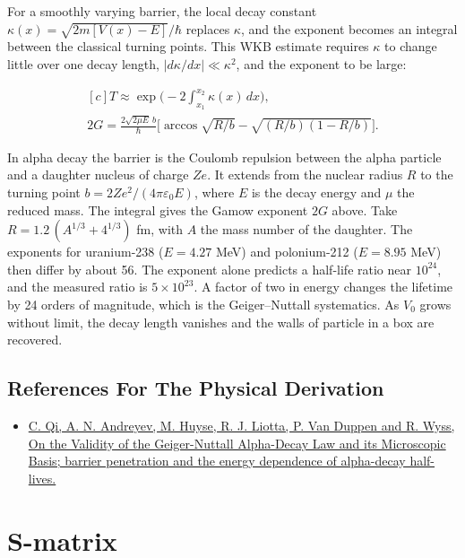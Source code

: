 \documentclass[11pt,oneside]{book}
\newenvironment{centeredalign}{\[\begin{gathered}[c]}{\end{gathered}\]}
\begin{document}
For a smoothly varying barrier, the local decay constant \(\kappa(x)=\sqrt{2m[V(x)-E]}/\hbar\) replaces \(\kappa\), and the exponent becomes an integral between the classical turning points. This WKB estimate requires \(\kappa\) to change little over one decay length, \(|d\kappa/dx|\ll\kappa^2\), and the exponent to be large:

\begin{centeredalign}
T\approx\exp\Big(-2\int_{x_1}^{x_2}\kappa(x)\,dx\Big),\\
2G=\frac{2\sqrt{2\mu E}\,b}{\hbar}\Big[\arccos\sqrt{R/b}-\sqrt{(R/b)(1-R/b)}\Big].
\end{centeredalign}

In alpha decay the barrier is the Coulomb repulsion between the alpha particle and a daughter nucleus of charge \(Ze\). It extends from the nuclear radius \(R\) to the turning point \(b=2Ze^2/(4\pi\varepsilon_0E)\), where \(E\) is the decay energy and \(\mu\) the reduced mass. The integral gives the Gamow exponent \(2G\) above. Take \(R=1.2\,(A^{1/3}+4^{1/3})\) fm, with \(A\) the mass number of the daughter. The exponents for uranium-238 (\(E=4.27\) MeV) and polonium-212 (\(E=8.95\) MeV) then differ by about 56. The exponent alone predicts a half-life ratio near \(10^{24}\), and the measured ratio is \(5\times10^{23}\). A factor of two in energy changes the lifetime by 24 orders of magnitude, which is the Geiger--Nuttall systematics. As \(V_0\) grows without limit, the decay length vanishes and the walls of particle in a box are recovered.

\subsection*{References For The Physical Derivation}
\begin{itemize}
\item \href{https://arxiv.org/abs/1405.5633}{C. Qi, A. N. Andreyev, M. Huyse, R. J. Liotta, P. Van Duppen and R. Wyss, On the Validity of the Geiger-Nuttall Alpha-Decay Law and its Microscopic Basis; barrier penetration and the energy dependence of alpha-decay half-lives.}
\end{itemize}





\clearpage

\section{S-matrix}
\end{document}
